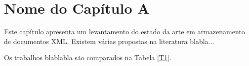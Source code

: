 \chapter{Nome do Capítulo A}

Este capítulo apresenta um levantamento do estado da arte em armazenamento de documentos XML. Existem várias propostas na literatura blabla...

\begin{table}
\caption{Comparação dos trabalhos\label{T1}} %
\end{table}

Os trabalhos blablabla são comparados na Tabela \ref{T1}. 
